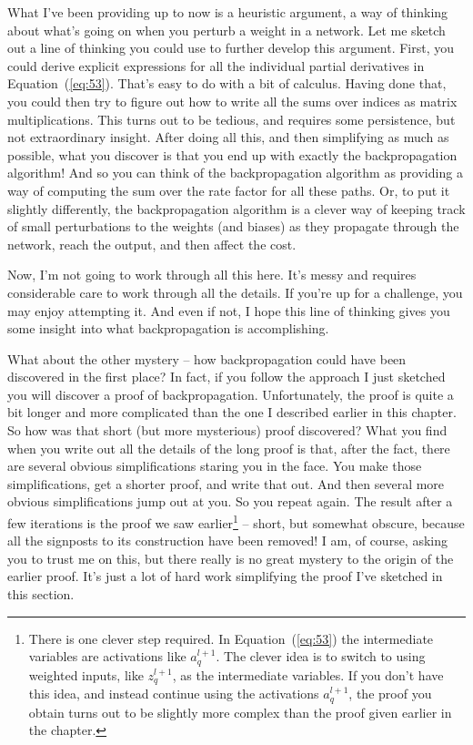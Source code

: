\documentclass[a4paper,twoside,10pt]{book}
\begin{document}
What I've been providing up to now is a heuristic argument, a way of thinking about what's going on when you perturb a weight in a network. Let me sketch out a line of thinking you could use to further develop this argument. First, you could derive explicit expressions for all the individual partial derivatives in Equation~(\ref{eq:53}). That's easy to do with a bit of calculus. Having done that, you could then try to figure out how to write all the sums over indices as matrix multiplications. This turns out to be tedious, and requires some persistence, but not extraordinary insight. After doing all this, and then simplifying as much as possible, what you discover is that you end up with exactly the backpropagation algorithm! And so you can think of the backpropagation algorithm as providing a way of computing the sum over the rate factor for all these paths. Or, to put it slightly differently, the backpropagation algorithm is a clever way of keeping track of small perturbations to the weights (and biases) as they propagate through the network, reach the output, and then affect the cost.

Now, I'm not going to work through all this here. It's messy and requires considerable care to work through all the details. If you're up for a challenge, you may enjoy attempting it. And even if not, I hope this line of thinking gives you some insight into what backpropagation is accomplishing.

What about the other mystery -- how backpropagation could have been discovered in the first place? In fact, if you follow the approach I just sketched you will discover a proof of backpropagation. Unfortunately, the proof is quite a bit longer and more complicated than the one I described earlier in this chapter. So how was that short (but more mysterious) proof discovered? What you find when you write out all the details of the long proof is that, after the fact, there are several obvious simplifications staring you in the face. You make those simplifications, get a shorter proof, and write that out. And then several more obvious simplifications jump out at you. So you repeat again. The result after a few iterations is the proof we saw earlier\footnote{There is one clever step required. In Equation~(\ref{eq:53}) the intermediate variables are activations like $a^{l+1}_q$. The clever idea is to switch to using weighted inputs, like $z^{l+1}_q$, as the intermediate variables. If you don't have this idea, and instead continue using the activations $a^{l+1}_q$, the proof you obtain turns out to be slightly more complex than the proof given earlier in the chapter.} -- short, but somewhat obscure, because all the signposts to its construction have been removed! I am, of course, asking you to trust me on this, but there really is no great mystery to the origin of the earlier proof. It's just a lot of hard work simplifying the proof I've sketched in this section.
\end{document}
